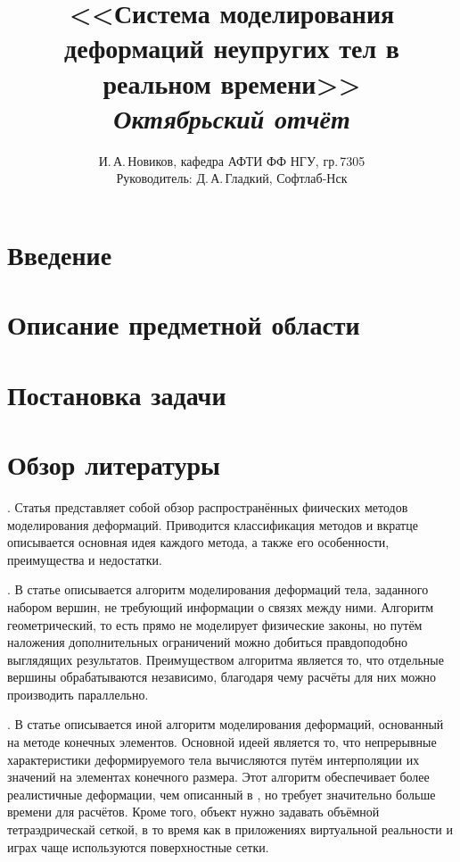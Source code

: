 \documentclass[a4paper,11pt]{report}
\author{И.\,А.\,Новиков, кафедра АФТИ ФФ НГУ, гр.\,7305\\ Руководитель: Д.\,А.\,Гладкий, Софтлаб-Нск}
\title{<<Система моделирования деформаций неупругих тел в реальном времени>>\\\itshape Октябрьский отчёт}
\begin{document}
  \maketitle
  \tableofcontents
  \chapter*{Введение}
  \chapter{Описание предметной области}
  \chapter{Постановка задачи}
  \chapter{Обзор литературы}
    \cite[Physically Based Deformable Models...]{muller-physmodels}. Статья представляет собой
      обзор распространённых фиических методов моделирования деформаций. Приводится классификация
      методов и вкратце описывается основная идея каждого метода, а также его особенности,
      преимущества и недостатки.

    \cite[Meshless Deformations...]{muller-meshless}. В статье описывается алгоритм
      моделирования деформаций тела, заданного набором вершин, не требующий информации о связях
      между ними. Алгоритм геометрический, то есть прямо не моделирует физические законы, но путём
      наложения дополнительных ограничений можно добиться правдоподобно выглядящих результатов.
      Преимуществом алгоритма является то, что отдельные вершины обрабатываются независимо,
      благодаря чему расчёты для них можно производить параллельно.

    \cite[Stable Real-Time Deformations]{muller-stable}. В статье описывается иной алгоритм
      моделирования деформаций, основанный на методе конечных элементов. Основной идеей является то,
      что непрерывные характеристики деформируемого тела вычисляются путём интерполяции их значений
      на элементах конечного размера. Этот алгоритм обеспечивает более реалистичные деформации, чем
      описанный в \cite{muller-meshless}, но требует значительно больше времени для расчётов. Кроме
      того, объект нужно задавать объёмной тетраэдрическай сеткой, в то время как в приложениях
      виртуальной реальности и играх чаще используются поверхностные сетки.
\end{document}
